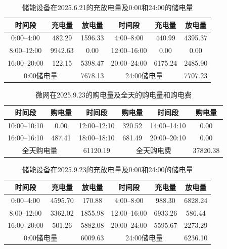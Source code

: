 \documentclass[UTF8]{ctexart}
\begin{document}
    \begin{table}[htbp]
        \centering
        \caption{储能设备在2025.6.21的充放电量及0:00和24:00的储电量}
        \label{tab:q3_battery_0621}
        \begin{tabular}{cccccc}
            \toprule
            时间段 & 充电量 & 放电量 & 时间段 & 充电量 & 放电量 \\
            \midrule
            0:00--4:00   & 482.29 & 1596.33 &
            4:00--8:00   & 440.99 & 4395.37 \\
            8:00--12:00  & 9942.63 & 0.00 &
            12:00--16:00 & 0.00 & 0.00 \\
            16:00--20:00 & 122.15 & 5398.47 &
            20:00--24:00 & 6175.24 & 2485.90 \\
            \midrule
            \multicolumn{2}{c}{0:00储电量} & 7678.13 &
            \multicolumn{2}{c}{24:00储电量} & 7707.23 \\
            \bottomrule
        \end{tabular}
    \end{table}
    
    \begin{table}[htbp]
        \centering
        \caption{微网在2025.9.23的购电量及全天的购电量和购电费}
        \label{tab:q3_tenminute_0923}
        \begin{tabular}{cccccc}
            \toprule
            时间段 & 购电量 & 时间段 & 购电量 & 时间段 & 购电量 \\
            \midrule
            10:00--10:10 & 0.00 &
            12:00--12:10 & 320.52 &
            14:00--14:10 & 0.00 \\
            16:00--16:10 & 487.41 &
            18:00--18:10 & 681.49 &
            20:00--20:10 & 0.00 \\
            \midrule
            \multicolumn{2}{c}{全天购电量} & 61120.19 &
            \multicolumn{2}{c}{全天购电费} & 37820.38 \\
            \bottomrule
        \end{tabular}
    \end{table}
    
    \begin{table}[htbp]
        \centering
        \caption{储能设备在2025.9.23的充放电量及0:00和24:00的储电量}
        \label{tab:q3_battery_0923}
        \begin{tabular}{cccccc}
            \toprule
            时间段 & 充电量 & 放电量 & 时间段 & 充电量 & 放电量 \\
            \midrule
            0:00--4:00   & 4595.70 & 170.88 &
            4:00--8:00   & 988.30 & 6828.24 \\
            8:00--12:00  & 3362.02 & 1855.98 &
            12:00--16:00 & 6933.26 & 586.44 \\
            16:00--20:00 & 501.26 & 5882.08 &
            20:00--24:00 & 5595.67 & 2273.29 \\
            \midrule
            \multicolumn{2}{c}{0:00储电量} & 6009.63 &
            \multicolumn{2}{c}{24:00储电量} & 6236.10 \\
            \bottomrule
        \end{tabular}
    \end{table}
    
\end{document}

